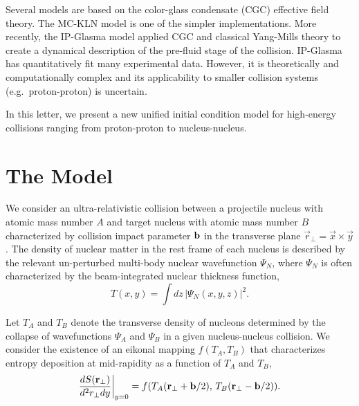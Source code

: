 \documentclass[aps,prl,reprint,amsmath,nofootinbib]{revtex4-1}
\begin{document}
Several models are based on the color-glass condensate (CGC) effective field theory.  The MC-KLN model is one
of the simpler implementations.  More recently, the IP-Glasma model applied CGC and classical Yang-Mills
theory to create a dynamical description of the pre-fluid stage of the collision.  IP-Glasma has
quantitatively fit many experimental data.  However, it is theoretically and computationally complex and its
applicability to smaller collision systems (e.g.~proton-proton) is uncertain.

In this letter, we present a new unified initial condition model for high-energy collisions ranging from
proton-proton to nucleus-nucleus.


\section{The Model}

We consider an ultra-relativistic collision between a projectile nucleus with atomic mass number $A$ and
target nucleus with atomic mass number $B$ characterized by collision impact parameter ${\bf b}$ in the
transverse plane $\vec{r}_\perp = \vec{x} \times \vec{y}$. The density of nuclear matter in the rest frame of
each nucleus is described by the relevant un-perturbed multi-body nuclear wavefunction $\Psi_N$, where
$\Psi_N$ is often characterized by the beam-integrated nuclear thickness function,
\begin{equation}
  T(x,y) = \int dz\, \left|\Psi_N(x,y,z) \right|^2.
\end{equation}

Let $T_A$ and $T_B$ denote the transverse density of nucleons determined by the collapse of wavefunctions
$\Psi_A$ and $\Psi_B$ in a given nucleus-nucleus collision. We consider the existence of an eikonal mapping
$f(T_A,T_B)$ that characterizes entropy deposition at mid-rapidity as a function of $T_A$ and $T_B$,
\begin{equation}
  \label{ansatz}
  \frac{dS({\bf r}_\perp)}{d^2r_\perp dy} \biggr \rvert_{y=0} =
  f(T_A({\bf r}_\perp + {\bf b}/2),\,T_B({\bf r}_\perp - {\bf b}/2)).
\end{equation}
\end{document}
